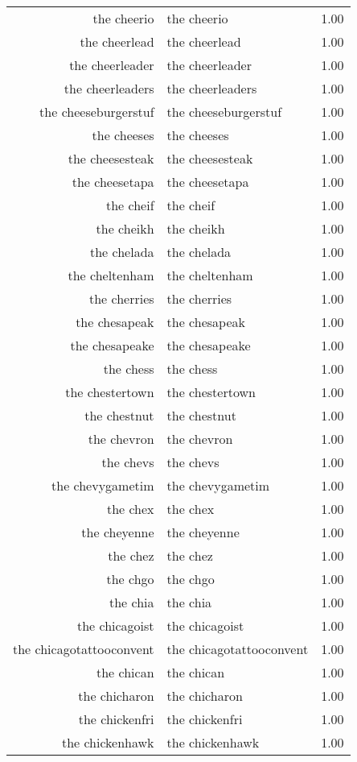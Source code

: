 \begin{table}[ht]
\begin{tabular}{rlr}
  the cheerio & the cheerio & 1.00 \\ 
  the cheerlead & the cheerlead & 1.00 \\ 
  the cheerleader & the cheerleader & 1.00 \\ 
  the cheerleaders & the cheerleaders & 1.00 \\ 
  the cheeseburgerstuf & the cheeseburgerstuf & 1.00 \\ 
  the cheeses & the cheeses & 1.00 \\ 
  the cheesesteak & the cheesesteak & 1.00 \\ 
  the cheesetapa & the cheesetapa & 1.00 \\ 
  the cheif & the cheif & 1.00 \\ 
  the cheikh & the cheikh & 1.00 \\ 
  the chelada & the chelada & 1.00 \\ 
  the cheltenham & the cheltenham & 1.00 \\ 
  the cherries & the cherries & 1.00 \\ 
  the chesapeak & the chesapeak & 1.00 \\ 
  the chesapeake & the chesapeake & 1.00 \\ 
  the chess & the chess & 1.00 \\ 
  the chestertown & the chestertown & 1.00 \\ 
  the chestnut & the chestnut & 1.00 \\ 
  the chevron & the chevron & 1.00 \\ 
  the chevs & the chevs & 1.00 \\ 
  the chevygametim & the chevygametim & 1.00 \\ 
  the chex & the chex & 1.00 \\ 
  the cheyenne & the cheyenne & 1.00 \\ 
  the chez & the chez & 1.00 \\ 
  the chgo & the chgo & 1.00 \\ 
  the chia & the chia & 1.00 \\ 
  the chicagoist & the chicagoist & 1.00 \\ 
  the chicagotattooconvent & the chicagotattooconvent & 1.00 \\ 
  the chican & the chican & 1.00 \\ 
  the chicharon & the chicharon & 1.00 \\ 
  the chickenfri & the chickenfri & 1.00 \\ 
  the chickenhawk & the chickenhawk & 1.00 \\ 

\end{tabular}
\end{table}

